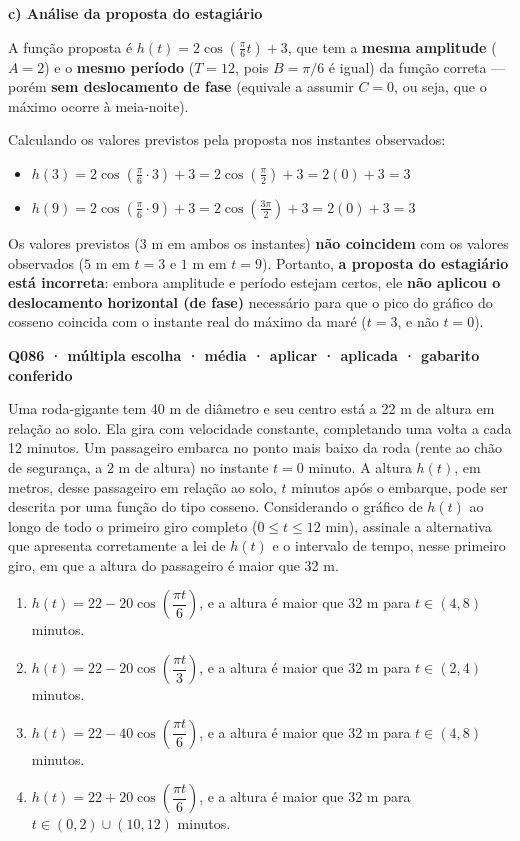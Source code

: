 \documentclass[11pt,a4paper]{article}
\begin{document}
\textbf{c) Análise da proposta do estagiário}

A função proposta é $h(t) = 2\cos\left(\frac{\pi}{6}t\right)+3$, que tem a \textbf{mesma amplitude} ($A=2$) e o \textbf{mesmo período} ($T=12$, pois $B=\pi/6$ é igual) da função correta — porém \textbf{sem deslocamento de fase} (equivale a assumir $C=0$, ou seja, que o máximo ocorre à meia-noite).

Calculando os valores previstos pela proposta nos instantes observados:

\begin{itemize}[nosep,leftmargin=*]
\item $h(3) = 2\cos\left(\frac{\pi}{6}\cdot 3\right)+3 = 2\cos\left(\frac{\pi}{2}\right)+3 = 2(0)+3 = 3$
\item $h(9) = 2\cos\left(\frac{\pi}{6}\cdot 9\right)+3 = 2\cos\left(\frac{3\pi}{2}\right)+3 = 2(0)+3 = 3$
\end{itemize}

Os valores previstos ($3$ m em ambos os instantes) \textbf{não coincidem} com os valores observados ($5$ m em $t=3$ e $1$ m em $t=9$). Portanto, \textbf{a proposta do estagiário está incorreta}: embora amplitude e período estejam certos, ele \textbf{não aplicou o deslocamento horizontal (de fase)} necessário para que o pico do gráfico do cosseno coincida com o instante real do máximo da maré ($t=3$, e não $t=0$).

\bigskip\noindent\textbf{Q086 · múltipla escolha · média · aplicar · aplicada · gabarito conferido}\par\nopagebreak
Uma roda-gigante tem 40 m de diâmetro e seu centro está a 22 m de altura em relação ao solo. Ela gira com velocidade constante, completando uma volta a cada 12 minutos. Um passageiro embarca no ponto mais baixo da roda (rente ao chão de segurança, a 2 m de altura) no instante $t = 0$ minuto. A altura $h(t)$, em metros, desse passageiro em relação ao solo, $t$ minutos após o embarque, pode ser descrita por uma função do tipo cosseno. Considerando o gráfico de $h(t)$ ao longo de todo o primeiro giro completo ($0 \le t \le 12$ min), assinale a alternativa que apresenta corretamente a lei de $h(t)$ e o intervalo de tempo, nesse primeiro giro, em que a altura do passageiro é maior que 32 m.
\begin{enumerate}[label=(\alph*)]
\item $h(t) = 22 - 20\cos\left(\dfrac{\pi t}{6}\right)$, e a altura é maior que 32 m para $t \in (4, 8)$ minutos.
\item $h(t) = 22 - 20\cos\left(\dfrac{\pi t}{3}\right)$, e a altura é maior que 32 m para $t \in (2, 4)$ minutos.
\item $h(t) = 22 - 40\cos\left(\dfrac{\pi t}{6}\right)$, e a altura é maior que 32 m para $t \in (4, 8)$ minutos.
\item $h(t) = 22 + 20\cos\left(\dfrac{\pi t}{6}\right)$, e a altura é maior que 32 m para $t \in (0, 2) \cup (10, 12)$ minutos.
\end{enumerate}
\end{document}
